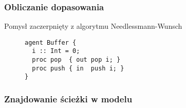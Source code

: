 \subsubsection{Obliczanie dopasowania}
Pomysł zaczerpnięty z algorytmu Needlessmann-Wunsch \cite{ea252fd3937a4a309a5e07e61e5531a7}
\begin{figure}[!ht]
\lstset{caption=Parser gramatyki, captionpos=b}
\lstset{label=src:passive, frame=single}
\begin{lstlisting}
agent Buffer {
  i :: Int = 0;
  proc pop  { out pop i; }
  proc push { in  push i; }
}
\end{lstlisting}
\end{figure}

\subsubsection{Znajdowanie ścieżki w modelu}

